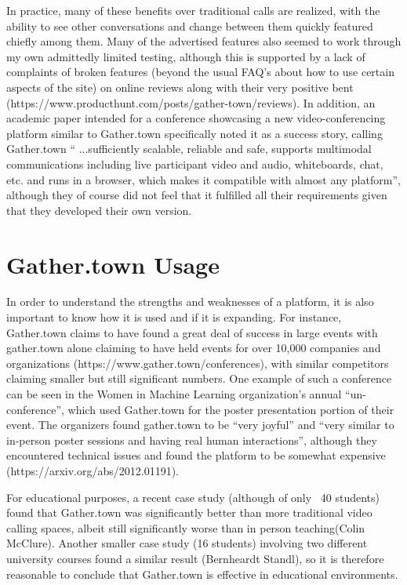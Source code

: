 \documentclass[bsc,frontabs,singlespacing,parskip,deptreport]{infthesis}
\begin{document}
In practice, many of these benefits over traditional calls are realized, with the ability to see other conversations and change between them quickly featured chiefly among them.  Many of the advertised features also seemed to work through my own admittedly limited testing, although this is supported by a lack of complaints of broken features (beyond the usual FAQ’s about how to use certain aspects of the site) on online reviews along with their very positive bent (https://www.producthunt.com/posts/gather-town/reviews). In addition, an academic paper intended for a conference showcasing a new video-conferencing platform similar to Gather.town specifically noted it as a success story, calling Gather.town “ ...sufficiently scalable, reliable and safe, supports multimodal communications including live participant video and audio, whiteboards, chat, etc. and runs in a browser, which makes it compatible with almost any platform”, although they of course did not feel that it fulfilled all their requirements given that they developed their own version.

\section{Gather.town Usage}

In order to understand the strengths and weaknesses of a platform, it is also important to know how it is used and if it is expanding.  For instance, Gather.town claims to have found a great deal of success in large events with gather.town alone claiming to have held events for over 10,000 companies and organizations (https://www.gather.town/conferences), with similar competitors claiming smaller but still significant numbers.  One example of such a conference can be seen in the Women in Machine Learning organization’s annual “un-conference”, which used Gather.town for the poster presentation portion of their event. The organizers found gather.town to be “very joyful” and “very similar to in-person poster sessions and having real human interactions”, although they encountered technical issues and found the platform to be somewhat expensive (https://arxiv.org/abs/2012.01191).

For educational purposes, a recent case study (although of only ~40 students) found that Gather.town was significantly better than more traditional video calling spaces, albeit still significantly worse than in person teaching(Colin McClure).  Another smaller case study (16 students) involving two different university courses found a similar result (Bernheardt Standl), so it is therefore reasonable to conclude that Gather.town is effective in educational environments.
\end{document}

